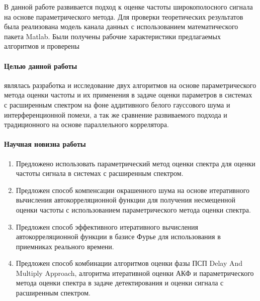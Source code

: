 В данной работе развивается подход к оценке частоты широкополосного сигнала на основе параметрического метода. Для проверки
теоретических результатов была реализована модель канала данных с использованием математического пакета Matlab. Были получены
рабочие характеристики предлагаемых алгоритмов и проверены 

\paragraph{Целью данной работы} являлась разработка и исследование двух алгоритмов на основе параметрического метода оценки частоты 
и их применения в задаче оценки параметров в системах с расширенным спектром на фоне аддитивного белого гауссового шума и интерференционной помехи,
а так же сравнение развиваемого подхода и традиционного на основе параллельного коррелятора.

\paragraph{Научная новизна работы}
\begin{enumerate}
	\item{Предложено использовать параметрический метод оценки спектра для оценки частоты сигнала в системах с расширенным спектром.}
	\item{Предложен способ компенсации окрашенного шума на основе итеративного вычисления автокорреляционной функции для
		получения несмещенной оценки частоты с использованием параметрического метода оценки спектра.}
	\item{Предложен способ эффективного итеративного вычисления автокорреляционной функции в базисе Фурье для использования в приемниках реального времени.}
	\item{Предложен способ комбинации алгоритмов оценки фазы ПСП Delay And Multiply Approach, алгоритма итеративной оценки АКФ и
		параметрического метода оценки спектра в задаче детектирования и оценки сигнала с расширенным спектром.}
\end{enumerate}

